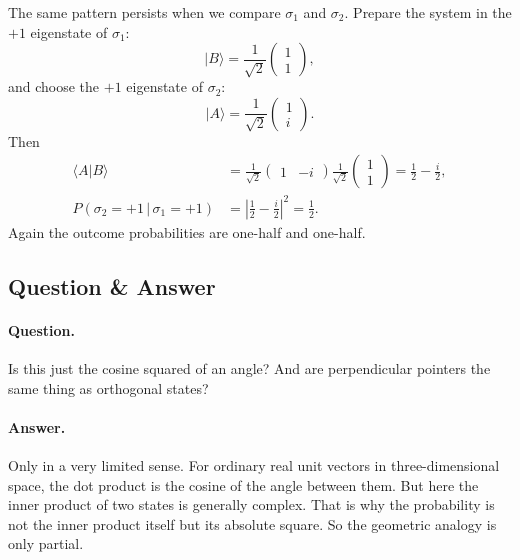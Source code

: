 The same pattern persists when we compare \(\sigma_1\) and \(\sigma_2\). Prepare the system in the \(+1\) eigenstate of \(\sigma_1\):
\begin{equation}
|B\rangle=
\frac{1}{\sqrt{2}}
\begin{pmatrix}
1\\
1
\end{pmatrix},
\end{equation}
and choose the \(+1\) eigenstate of \(\sigma_2\):
\begin{equation}
|A\rangle=
\frac{1}{\sqrt{2}}
\begin{pmatrix}
1\\
i
\end{pmatrix}.
\end{equation}
Then
\begin{align}
\langle A|B\rangle
&=
\frac{1}{\sqrt{2}}
\begin{pmatrix}
1 & -i
\end{pmatrix}
\frac{1}{\sqrt{2}}
\begin{pmatrix}
1\\
1
\end{pmatrix}
=
\frac{1}{2}-\frac{i}{2},\\
P(\sigma_2=+1\,|\,\sigma_1=+1)
&=
\left|\frac{1}{2}-\frac{i}{2}\right|^2
=
\frac{1}{2}.
\end{align}
Again the outcome probabilities are one-half and one-half.

\subsection{Question \& Answer}

\paragraph{Question.} Is this just the cosine squared of an angle? And are perpendicular pointers the same thing as orthogonal states?

\paragraph{Answer.} Only in a very limited sense. For ordinary real unit vectors in three-dimensional space, the dot product is the cosine of the angle between them. But here the inner product of two states is generally complex. That is why the probability is not the inner product itself but its absolute square. So the geometric analogy is only partial.

